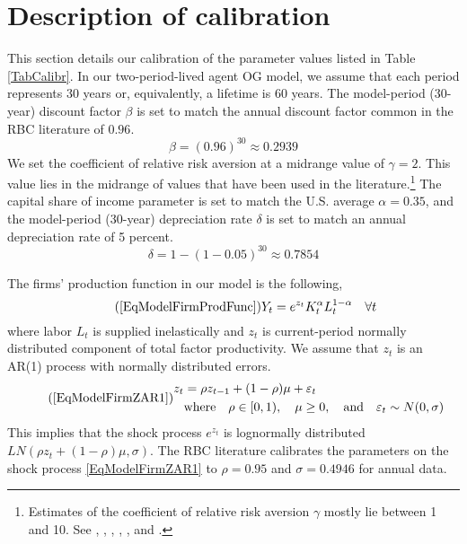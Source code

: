 \documentclass[letterpaper,12pt]{article}
\theoremstyle{definition}
\newcommand\ve{\varepsilon}
\begin{document}
\section{Description of calibration}\label{SecTAppCalib}

  This section details our calibration of the parameter values listed in Table \ref{TabCalibr}. In our two-period-lived agent OG model, we assume that each period represents 30 years or, equivalently, a lifetime is 60 years. The model-period (30-year) discount factor $\beta$ is set to match the annual discount factor common in the RBC literature of $0.96$.
  \begin{equation}\label{EqTAppCalib_beta}
    \beta = (0.96)^{30}\approx 0.2939
  \end{equation}
  We set the coefficient of relative risk aversion at a midrange value of $\gamma=2$. This value lies in the midrange of values that have been used in the literature.\footnote{Estimates of the coefficient of relative risk aversion $\gamma$ mostly lie between 1 and 10. See \citet{MankiwZeldes:1991}, \citet{Blake:1996}, \citet{Campbell:1996}, \citet{Kocherlakota:1996}, \citet{BravConstantinidesGeczy:2002}, and \citet{MehraPrescott:1985}.} The capital share of income parameter is set to match the U.S. average $\alpha=0.35$, and the model-period (30-year) depreciation rate $\delta$ is set to match an annual depreciation rate of 5 percent.
  \begin{equation}\label{EqTAppCalib_delta}
    \delta = 1 - (1 - 0.05)^{30}\approx 0.7854
  \end{equation}

  The firms' production function in our model is the following,
  \begin{equation}\tag{\ref{EqModelFirmProdFunc}}
    Y_t = e^{z_t}K_t^\alpha L_t^{1-\alpha} \quad\forall t
  \end{equation}
  where labor $L_t$ is supplied inelastically and $z_t$ is current-period normally distributed component of total factor productivity. We assume that $z_t$ is an AR(1) process with normally distributed errors.
  \begin{equation}\tag{\ref{EqModelFirmZAR1}}
    \begin{split}
      z_t &= \rho z_{t-1} + (1-\rho)\mu + \ve_t \\
      &\text{where}\quad \rho\in[0,1), \quad\mu\geq 0, \quad\text{and}\quad \ve_t \sim N(0,\sigma)
    \end{split}
  \end{equation}
  This implies that the shock process $e^{z_t}$ is lognormally distributed $LN(\rho z_t + (1-\rho)\mu,\sigma)$. The RBC literature calibrates the parameters on the shock process \eqref{EqModelFirmZAR1} to $\rho=0.95$ and $\sigma = 0.4946$ for annual data.
\end{document}
